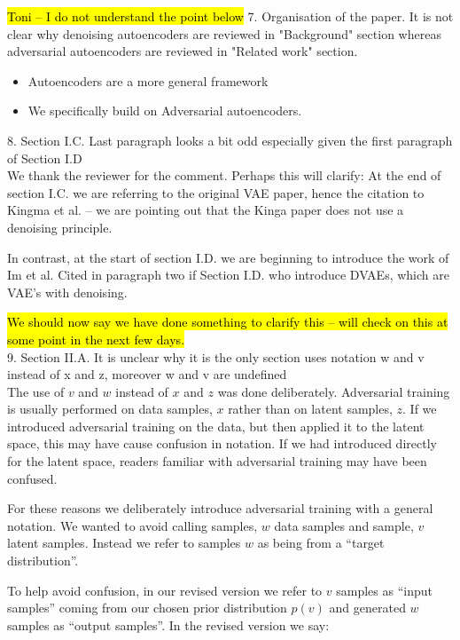 \documentclass{article}
\begin{document}
\hl{Toni -- I do not understand the point below}
{\color{blue}
7. Organisation of the paper. It is not clear why denoising autoencoders are reviewed in "Background" section whereas adversarial autoencoders are reviewed in "Related work" section.}\\

\begin{itemize}
    \item Autoencoders are a more general framework
    \item We specifically build on Adversarial autoencoders.
\end{itemize}

{\color{blue}
8. Section I.C. Last paragraph looks a bit odd especially given the first paragraph of Section I.D}\\

We thank the reviewer for the comment.  Perhaps this will clarify: At the end of section I.C. we are referring to the original VAE paper, hence the citation to Kingma et al. -- we are pointing out that the Kinga paper does not use a denoising principle.

In contrast, at the start of section I.D. we are beginning to introduce the work of Im et al. Cited in paragraph two if Section I.D. who introduce DVAEs, which are VAE's with denoising.

\hl{We should now say we have done something to clarify this -- will check on this at some point in the next few days.}\\

{\color{blue}
9. Section II.A. It is unclear why it is the only section uses notation w and v instead of x and z, moreover w and v are undefined}\\

The use of $v$ and $w$ instead of $x$ and $z$ was done deliberately. Adversarial training is usually performed on data samples, $x$ rather than on latent samples, $z$. If we introduced adversarial training on the data, but then applied it to the latent space, this may have cause confusion in notation. If we had introduced directly for the latent space, readers familiar with adversarial training may have been confused. 

For these reasons we deliberately introduce adversarial training with a general notation. We wanted to avoid calling samples, $w$ data samples and sample, $v$ latent samples. Instead we refer to samples $w$ as being from a ``target distribution''.

To help avoid confusion, in our revised version we refer to $v$ samples as ``input samples'' coming from our chosen prior distribution $p(v)$ and generated $w$ samples as ``output samples''. In the revised version we say:
    
\end{document}
